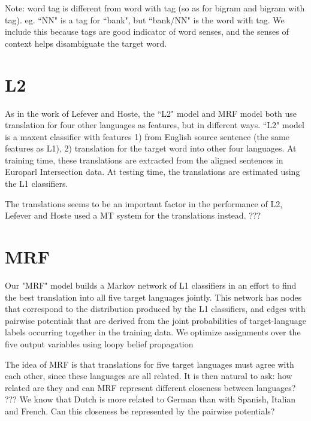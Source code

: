\documentclass[11pt,letterpaper]{article}
\begin{document}
Note: word tag is different from word with tag (so as for bigram and bigram
with tag). eg. ``NN" is a tag for ``bank", but ``bank/NN" is the word with tag.
We include this because tags are good indicator of word senses, and the senses
of context helps disambiguate the target word. 

\section{L2}
As in the work of Lefever and Hoste, the ``L2" model and MRF model both use
translation for four other languages as features, but in different ways.  ``L2"
model is a maxent classifier with features 1) from English source sentence (the
same features as L1), 2) translation for the target word into other four
languages.  At training time, these translations are extracted from the aligned
sentences in Europarl Intersection data.  At testing time, the translations are
estimated using the L1 classifiers. 

The translations seems to be an important factor in the performance of L2,
Lefever and Hoste used a MT system for the translations instead.
???



\section{MRF}
Our "MRF" model builds a Markov network of L1 classifiers in an effort to find
the best translation into all five target languages jointly. This network has
nodes that correspond to the distribution produced by the L1 classifiers, and
edges with pairwise potentials that are derived from the joint probabilities of
target-language labels occurring together in the training data. We optimize
assignments over the five output variables using loopy belief propagation

The idea of MRF is that translations for five target languages must agree with
each other, since these languages are all related.  It is then natural to ask:
how related are they and can MRF represent different closeness between
languages?  ???  We know that Dutch is more related to German than with
Spanish, Italian and French. Can this closeness be represented by the pairwise
potentials?
\end{document}
